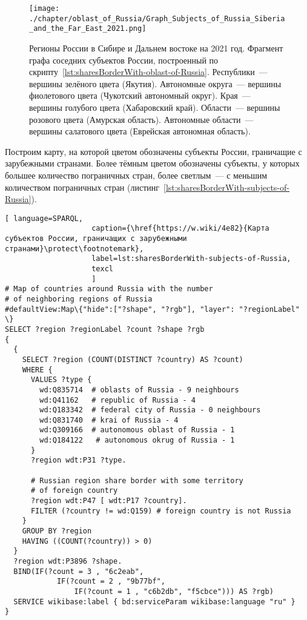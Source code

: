 \begin{fullwidth}
\begin{figure*}[h]
	\texttt{[image: ./chapter/oblast\_of\_Russia/Graph\_Subjects\_of\_Russia\_Siberia\_and\_the\_Far\_East\_2021.png]}
	\caption[Фрагмент графа субъектов России, 2021 год.]{Регионы России в Сибире и Дальнем востоке на 2021 год. 
    Фрагмент графа соседних субъектов России, построенный по скрипту~\protect\ref{lst:sharesBorderWith-oblast-of-Russia}.
	Республики~--- вершины зелёного цвета (Якутия).
	Автономные округа~--- вершины фиолетового цвета (Чукотский автономный округ).
	Края~--- вершины голубого цвета (Хабаровский край).
	Области~--- вершины розового цвета (Амурская область).
	Автономные области~--- вершины салатового цвета (Еврейская автономная область).}%
      \label{fig:sharesBorderWith-oblast-of-Russia-Kaliningrad-fig}%
\end{figure*} 
\end{fullwidth}

\newpage
Построим карту, на которой цветом обозначены субъекты России, 
граничащие с зарубежными странами. 
Более тёмным цветом обозначены субъекты, у которых большее количество пограничных стран, 
более светлым~--- с меньшим количеством пограничных стран (листинг~\ref{lst:sharesBorderWith-subjects-of-Russia}).

\lstset{numbers=left, firstnumber=1, frame=single}
\begin{lstlisting}[ language=SPARQL, 
                    caption={\href{https://w.wiki/4e82}{Карта субъектов России, граничащих с зарубежными странами}\protect\footnotemark},
                    label=lst:sharesBorderWith-subjects-of-Russia,
                    texcl 
                    ]
# Map of countries around Russia with the number 
# of neighboring regions of Russia
#defaultView:Map\{"hide":["?shape", "?rgb"], "layer": "?regionLabel" \}
SELECT ?region ?regionLabel ?count ?shape ?rgb
{
  {
    SELECT ?region (COUNT(DISTINCT ?country) AS ?count)
    WHERE {
      VALUES ?type {
        wd:Q835714  # oblasts of Russia - 9 neighbours
        wd:Q41162   # republic of Russia - 4
        wd:Q183342  # federal city of Russia - 0 neighbours
        wd:Q831740  # krai of Russia - 4
        wd:Q309166  # autonomous oblast of Russia - 1
        wd:Q184122   # autonomous okrug of Russia - 1
      }
      ?region wdt:P31 ?type.
  
      # Russian region share border with some territory 
      # of foreign country
      ?region wdt:P47 [ wdt:P17 ?country].
      FILTER (?country != wd:Q159) # foreign country is not Russia
    }
    GROUP BY ?region
    HAVING ((COUNT(?country)) > 0)
  }
  ?region wdt:P3896 ?shape.
  BIND(IF(?count = 3 , "6c2eab", 
            IF(?count = 2 , "9b77bf", 
                IF(?count = 1 , "c6b2db", "f5cbce"))) AS ?rgb)
  SERVICE wikibase:label { bd:serviceParam wikibase:language "ru" }  
}
\end{lstlisting}%

